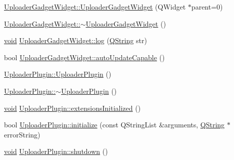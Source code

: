 \begin{DoxyCompactItemize}
\item 
\hyperlink{group___y_modem_uploader_ga7065a066176fac2b996efaea8fc29a36}{\-Uploader\-Gadget\-Widget\-::\-Uploader\-Gadget\-Widget} (\-Q\-Widget $\ast$parent=0)
\item 
\hyperlink{group___y_modem_uploader_ga81ab4c8e328f917680b38093e9c69e6c}{\-Uploader\-Gadget\-Widget\-::$\sim$\-Uploader\-Gadget\-Widget} ()
\item 
\hyperlink{group___u_a_v_objects_plugin_ga444cf2ff3f0ecbe028adce838d373f5c}{void} \hyperlink{group___y_modem_uploader_ga9927716b91171f296e3a3210e372e702}{\-Uploader\-Gadget\-Widget\-::log} (\hyperlink{group___u_a_v_objects_plugin_gab9d252f49c333c94a72f97ce3105a32d}{\-Q\-String} str)
\item 
bool \hyperlink{group___y_modem_uploader_gab177e7f52b6bfc0de4547c2e37ca9c56}{\-Uploader\-Gadget\-Widget\-::auto\-Update\-Capable} ()
\item 
\hyperlink{group___y_modem_uploader_ga5dbbc19d5b4c070d0326c2e8695b2a9b}{\-Uploader\-Plugin\-::\-Uploader\-Plugin} ()
\item 
\hyperlink{group___y_modem_uploader_gab9ab9e0558901e7f3ca2e24750ded4e2}{\-Uploader\-Plugin\-::$\sim$\-Uploader\-Plugin} ()
\item 
\hyperlink{group___u_a_v_objects_plugin_ga444cf2ff3f0ecbe028adce838d373f5c}{void} \hyperlink{group___y_modem_uploader_ga1e319fd52ea2d055faae5cfcc9b38041}{\-Uploader\-Plugin\-::extensions\-Initialized} ()
\item 
bool \hyperlink{group___y_modem_uploader_gaed3cc44adfc0c7107aa35f52e5265da2}{\-Uploader\-Plugin\-::initialize} (const \-Q\-String\-List \&arguments, \hyperlink{group___u_a_v_objects_plugin_gab9d252f49c333c94a72f97ce3105a32d}{\-Q\-String} $\ast$error\-String)
\item 
\hyperlink{group___u_a_v_objects_plugin_ga444cf2ff3f0ecbe028adce838d373f5c}{void} \hyperlink{group___y_modem_uploader_gac966b3a48b2c1de74e802f0092479ab2}{\-Uploader\-Plugin\-::shutdown} ()
\end{DoxyCompactItemize}
